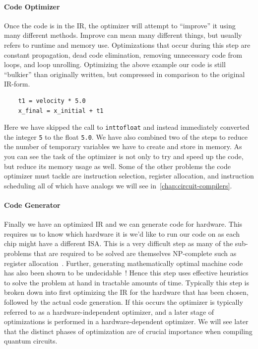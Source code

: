 \paragraph{Code Optimizer}
Once the code is in the \ac{IR}, the optimizer will attempt to ``improve'' it using many different methods.
Improve can mean many different things, but usually refers to runtime and memory use.
Optimizations that occur during this step are constant propagation, dead code elimination, removing unnecessary code from loops, and loop unrolling.
Optimizing the above example our code is still ``bulkier'' than originally written, but compressed in comparison to the original \ac{IR}-form.
\begin{lstlisting}
    t1 = velocity * 5.0
    x_final = x_initial + t1
\end{lstlisting}
Here we have skipped the call to \texttt{inttofloat} and instead immediately converted the integer \texttt{5} to the float \texttt{5.0}.
We have also combined two of the steps to reduce the number of temporary variables we have to create and store in memory.
As you can see the task of the optimizer is not only to try and speed up the code, but reduce its memory usage as well.
Some of the other problems the code optimizer must tackle are instruction selection, register allocation, and instruction scheduling all of which have analogs we will see in~\cref{chap:circuit-compilers}.

\paragraph{Code Generator}
Finally we have an optimized \ac{IR} and we can generate code for hardware.
This requires us to know which hardware it is we'd like to run our code on as each chip might have a different \ac{ISA}.
This is a very difficult step as many of the sub-problems that are required to be solved are themselves NP-complete such as register allocation~\cite{register-allocation-NP}. %
Further, generating mathematically optimal machine code has also been shown to be undecidable~\cite{dragonbook}!
Hence this step uses effective heuristics to solve the problem at hand in tractable amounts of time.
Typically this step is broken down into first optimizing the \ac{IR} for the hardware that has been chosen, followed by the actual code generation.
If this occurs the optimizer is typically referred to as a hardware-independent optimizer, and a later stage of optimizations is performed in a hardware-dependent optimizer.
We will see later that the distinct phases of optimization are of crucial importance when compiling quantum circuits.

